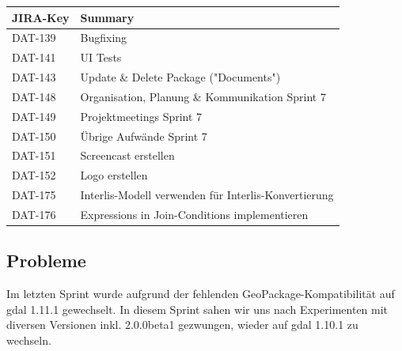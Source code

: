 \begin{table}[H]	
\centering
\begin{tabular}{ll}
\toprule
\textbf{JIRA-Key} & \textbf{Summary}\\
\midrule
DAT-139 & Bugfixing \\
DAT-141 & UI Tests \\
DAT-143 & Update \& Delete Package ("Documents") \\
DAT-148 & Organisation, Planung \& Kommunikation Sprint 7 \\
DAT-149 & Projektmeetings Sprint 7 \\
DAT-150 & Übrige Aufwände Sprint 7 \\
DAT-151 & Screencast erstellen \\
DAT-152 & Logo erstellen \\
DAT-175 & Interlis-Modell verwenden für Interlis-Konvertierung \\
DAT-176 & Expressions in Join-Conditions implementieren \\
\bottomrule
\end{tabular}	
\end{table}

\subsection*{Probleme}
Im letzten Sprint wurde aufgrund der fehlenden GeoPackage-Kompatibilität auf \acs{gdal} 1.11.1 gewechselt. In diesem Sprint sahen wir uns nach Experimenten mit diversen Versionen inkl. 2.0.0beta1 gezwungen, wieder auf \acs{gdal} 1.10.1 zu wechseln.